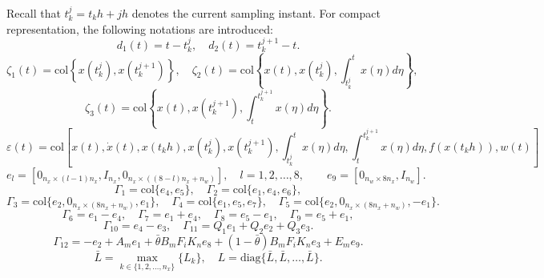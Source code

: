 \documentclass[preprint,review,fleqn,sort&compress,3p]{elsarticle}
\theoremstyle{definition} %
\theoremstyle{definition}%
\begin{document}
	Recall that $t_k^j=t_k h+jh$ denotes the current sampling instant. For compact representation, the following notations are introduced:
	\begin{equation*}
		d_1(t) = t - t^j_k, \quad  
		d_2(t) = t^{j+1}_{k} - t.
	\end{equation*}
	\begin{equation*}
		\zeta_1(t) = \mathrm{col} \left\{ x(t^j_k),  x(t^{j+1}_{k}) \right\}, \quad
		\zeta_2(t) = \mathrm{col} \left\{ x(t), x(t_k^j), \int_{t_k^j}^t x(\eta) d\eta \right\},
	\end{equation*}
	\begin{equation*}
		\zeta_3(t) = \mathrm{col} \left\{ x(t), x(t_k^{j+1}), \int_t^{t_k^{j+1}} x(\eta) d\eta \right\}.
	\end{equation*}
	\begin{equation*}
		\varepsilon(t) = \mathrm{col}\left[
		x(t),   \dot{x}(t),   x(t_k h),
		x(t_k^j),   x(t^{j+1}_k),
		\int_{t_k^j}^{t} x(\eta) d\eta,
		\int_{t}^{t_k^{j+1}} x(\eta) d\eta,
		f(x(t_k h)),  w(t)
		\right]
	\end{equation*}
	\begin{equation*}
		e_l = \left[ 0_{n_x \times (l-1)n_x}, I_{n_x}, 0_{n_x \times ((8-l)n_x+n_w)} \right],\quad l = 1,2,\dots,8,\qquad e_9 = \left[ 0_{n_w \times 8n_x}, I_{n_w} \right].
	\end{equation*}
	\begin{equation*}
		\Gamma_{1}=\mathrm{col}\{e_{4},e_{5}\},\quad
		\Gamma_{2}=\mathrm{col}\{e_{1},e_{4},e_{6}\},
	\end{equation*}
	\begin{equation*}
		\Gamma_{3}=\mathrm{col}\{e_{2},0_{n_x\times (8n_x+n_w)},e_{1}\},\quad
		\Gamma_{4}=\mathrm{col}\{e_{1},e_{5},e_{7}\},\quad
		\Gamma_{5}=\mathrm{col}\{e_{2},0_{n_x\times (8n_x+n_w)},-e_{1}\}.
	\end{equation*}
	\begin{equation*}
		\Gamma_{6}=e_{1} - e_{4},\quad
		\Gamma_{7}=e_{1} + e_{4},\quad
		\Gamma_{8}=e_{5} - e_{1},\quad
		\Gamma_{9}=e_{5} + e_{1},
	\end{equation*}
	\begin{equation*}
		\Gamma_{10}=e_{4} - e_{3},
		\quad
		\Gamma_{11}=Q_1e_{1}+Q_2e_{2}+Q_3e_{3}.
	\end{equation*}
	\begin{equation*}
		\Gamma_{12}= 
		-e_{2} + A_me_{1} 
		+ \bar{\theta} B_{m} F_{i} K_{n} e_{8}
		+(1-\bar{\theta})B_{m} F_{i} K_{n} e_{3}
		+E_m e_{9}.
	\end{equation*}
	\begin{equation*}
		\bar{L}= \max_{k \in \{1,2,\ldots,n_x\}} \{L_k\},
		\quad
		L = \mathrm{diag}\{\bar{L}, \bar{L}, \dots, \bar{L}\}.
	\end{equation*}
	
\end{document}
